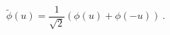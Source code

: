 \begin{equation}
  \tilde{\phi}(u) = \frac{1}{\sqrt{2}} (\phi (u)+\phi (-u)) \ .
\label{phitilde}
\end{equation}


